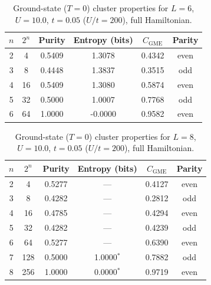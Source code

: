 \begin{table}[h]\centering
\caption{Ground-state ($T=0$) cluster properties for $L=6$, $U=10.0$, $t=0.05$ ($U/t=200$), full Hamiltonian.}
\begin{tabular}{@{}cccccc@{}}\toprule
$n$ & $2^n$ & Purity & Entropy (bits) & $C_{\mathrm{GME}}$ & Parity \\
\midrule
2 & 4 & 0.5409 & 1.3078 & 0.4342 & even \\
3 & 8 & 0.4448 & 1.3837 & 0.3515 & odd \\
4 & 16 & 0.5409 & 1.3080 & 0.5874 & even \\
5 & 32 & 0.5000 & 1.0007 & 0.7768 & odd \\
6 & 64 & 1.0000 & -0.0000 & 0.9582 & even \\
\bottomrule\end{tabular}\end{table}

\begin{table}[h]\centering
\caption{Ground-state ($T=0$) cluster properties for $L=8$, $U=10.0$, $t=0.05$ ($U/t=200$), full Hamiltonian.}
\begin{tabular}{@{}cccccc@{}}\toprule
$n$ & $2^n$ & Purity & Entropy (bits) & $C_{\mathrm{GME}}$ & Parity \\
\midrule
2 & 4 & 0.5277 & --- & 0.4127 & even \\
3 & 8 & 0.4282 & --- & 0.2812 & odd \\
4 & 16 & 0.4785 & --- & 0.4294 & even \\
5 & 32 & 0.4282 & --- & 0.4239 & odd \\
6 & 64 & 0.5277 & --- & 0.6390 & even \\
7 & 128 & 0.5000 & 1.0000$^{*}$ & 0.7882 & odd \\
8 & 256 & 1.0000 & 0.0000$^{*}$ & 0.9719 & even \\
\bottomrule\end{tabular}\end{table}

